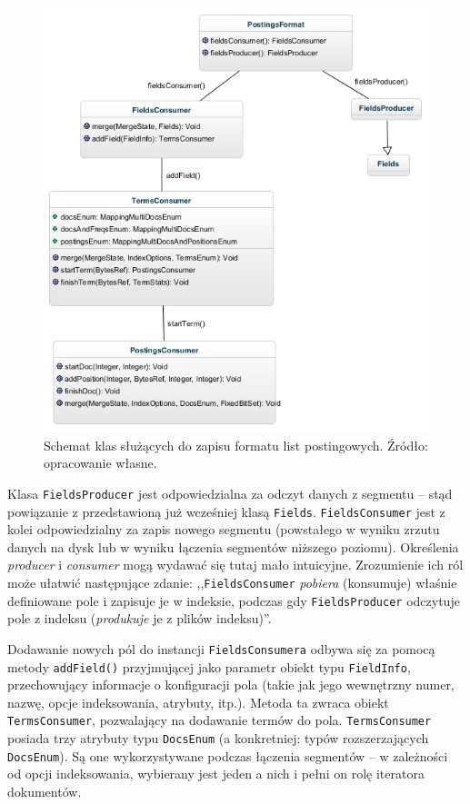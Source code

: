 \begin{figure}[p]
 \includegraphics[scale=0.65]{pictures/PostingsFormat_1.jpg}
 \caption{Schemat klas służących do zapisu formatu list postingowych. Źródło: opracowanie własne.\label{fig:postingFormat}}
\end{figure}

Klasa \texttt{FieldsProducer} jest odpowiedzialna za odczyt danych z segmentu -- stąd powiązanie z przedstawioną już wcześniej klasą \texttt{Fields}. \texttt{FieldsConsumer} jest z kolei odpowiedzialny za zapis nowego segmentu (powstałego w wyniku zrzutu danych na dysk lub w wyniku łączenia segmentów niższego poziomu). Określenia \emph{producer} i \emph{consumer} mogą wydawać się tutaj mało intuicyjne. Zrozumienie ich ról może ułatwić następujące zdanie: ,,\texttt{FieldsConsumer} \emph{pobiera} (konsumuje) właśnie definiowane pole i zapisuje je w indeksie, podczas gdy \texttt{FieldsProducer} odczytuje pole z indeksu (\emph{produkuje} je z plików indeksu)''.

Dodawanie nowych pól do instancji \texttt{FieldsConsumera} odbywa się za pomocą metody \texttt{addField()} przyjmującej jako parametr obiekt typu \texttt{FieldInfo}, przechowujący informacje o konfiguracji pola (takie jak jego wewnętrzny numer, nazwę, opcje indeksowania, atrybuty, itp.). Metoda ta zwraca obiekt \texttt{TermsConsumer}, pozwalający na dodawanie termów do pola. \texttt{TermsConsumer} posiada trzy atrybuty typu \texttt{DocsEnum} (a konkretniej: typów rozszerzających \texttt{DocsEnum}). Są one wykorzystywane podczas łączenia segmentów -- w zależności od opcji indeksowania, wybierany jest jeden a nich i pełni on rolę iteratora dokumentów.

